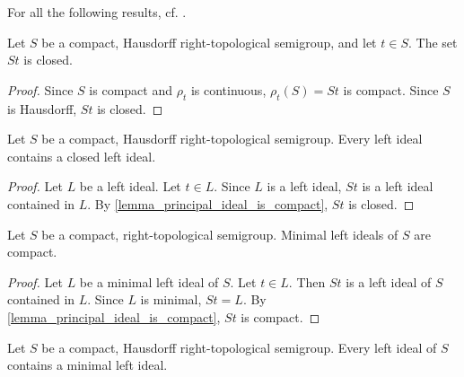 For all the following results, cf. \cite[Corollary 2.6 and surrounding]{hindman_strauss_book_2012}. 

\begin{lemma}
\label{lemma_principal_ideal_is_compact}
\leanok{}
    Let $S$ be a compact, Hausdorff right-topological semigroup, and let $t \in S$.  The set $St$ is closed.
\end{lemma}

\begin{proof}
\leanok{}
    Since $S$ is compact and $\rho_t$ is continuous, $\rho_t(S) = St$ is compact.  Since $S$ is Hausdorff, $St$ is closed.
\end{proof}

\begin{lemma}
\label{lemma_left_ideal_contains_closed_left_ideal}
\leanok{}
    Let $S$ be a compact, Hausdorff right-topological semigroup.  Every left ideal contains a closed left ideal.
\end{lemma}

\begin{proof}
\leanok{}
    Let $L$ be a left ideal.  Let $t \in L$.  Since $L$ is  a left ideal, $St$ is a left ideal contained in $L$.  By \cref{lemma_principal_ideal_is_compact}, $St$ is closed.
\end{proof}

\begin{lemma}
\label{lemma_minimal_left_ideal_compact}
\leanok{}
    Let $S$ be a compact, right-topological semigroup.  Minimal left ideals of $S$ are compact.
\end{lemma}

\begin{proof}
\leanok{}
    Let $L$ be a minimal left ideal of $S$.  Let $t \in L$. Then $St$ is a left ideal of $S$ contained in $L$.  Since $L$ is minimal, $St = L$.  By \cref{lemma_principal_ideal_is_compact}, $St$ is compact.
\end{proof}


\begin{lemma}
\label{thm_every_left_contains_minimal_left}
\leanok{}
    Let $S$ be a compact, Hausdorff right-topological semigroup.  Every left ideal of $S$ contains a minimal left ideal.
\end{lemma}

